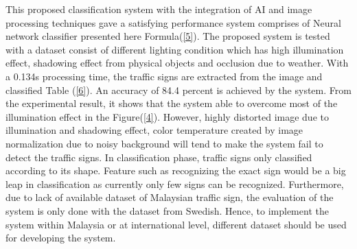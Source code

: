 \documentclass[11pt]{article}
\begin{document}
 This proposed classification system with the integration of AI and image processing techniques gave a satisfying performance system comprises of Neural network classifier presented here Formula(\ref{5}). The proposed system is tested with a dataset consist of different lighting condition which has high illumination effect, shadowing effect from physical objects and occlusion due to weather. With a 0.134s processing time, the traffic signs are extracted from the image and classified Table (\ref{6}). An accuracy of 84.4 percent is achieved by the system. From the experimental result, it shows that the system able to overcome most of the illumination effect in the Figure(\ref{4}). However, highly distorted image due to illumination and shadowing effect, color temperature created by image normalization due to noisy background will tend to make the system fail to detect the traffic signs. In classification phase, traffic signs only classified according to its shape. Feature such as recognizing the exact sign would be a big leap in classification as currently only few signs can be recognized. Furthermore, due to lack of available dataset of Malaysian traffic sign, the evaluation of the system is only done with the dataset from Swedish. Hence, to implement the system within Malaysia or at international level, different dataset should be used for developing the system. \par
\end{document}

